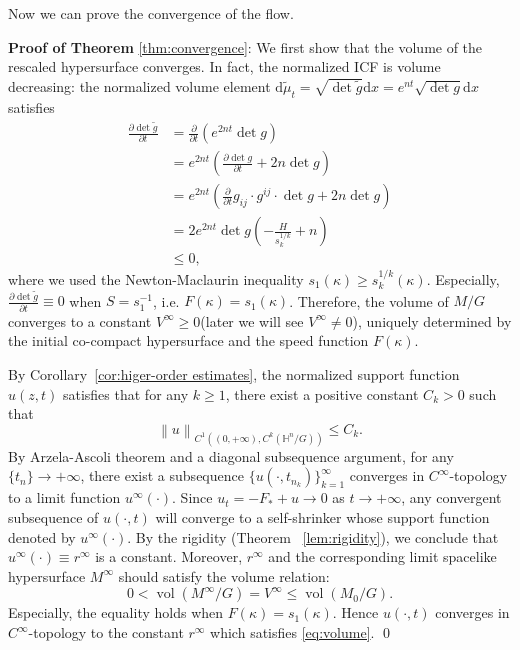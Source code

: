 \documentclass[reqno]{amsart}
\theoremstyle{remark}
\newcommand{\norm}[1]{\left\lVert{#1}\right\rVert}
\newcommand{\dd}{\ensuremath{\text{d}}}
\renewcommand{\H}{{\mathbb{H}}}
\newcommand{\pd}[2]{\frac{\partial {#1}}{\partial {#2}}}
\theoremstyle{definition}
\numberwithin{equation}{section}
\begin{document}
Now we can prove the convergence of the flow. \par
\textbf{Proof of Theorem }{\ref{thm:convergence}}: 
We first show that the volume of the rescaled hypersurface converges. In fact, the normalized ICF is volume decreasing: the normalized volume element \(\dd \tilde{\mu}_t = \sqrt{\det \tilde{g}}\dd x = e^{nt} \sqrt{\det g}\dd x\) satisfies 
\[ \begin{aligned}
    \pd{\det \tilde{g}}{t} &= \pd{}{t}\left(e^{2nt} \det g \right) \\
    &= e^{2nt}\left( \pd{\det g}{t} + 2n\det g \right) \\
    &= e^{2nt}\left( \pd{}{t}g_{ij} \cdot g^{ij} \cdot \det g + 2n\det g \right) \\
    &= 2e^{2nt}\det g \left( -\frac{H}{s_k^{1/k}} + n \right) \\
    &\leq 0,
\end{aligned}  \]
where we used the Newton-Maclaurin inequality \( s_1(\kappa)\geq s_k^{1/k}(\kappa) \). Especially, \(\pd{\det \tilde{g}}{t} \equiv 0\) when \(S = s_1^{-1}\), i.e. \(F(\kappa) = s_1(\kappa)\). Therefore, the volume of \(M / G\) converges to a constant \(V^\infty \geq 0\)(later we will see \(V^\infty \neq 0\)), uniquely determined by the initial co-compact hypersurface and the speed function \(F(\kappa)\).  
\par By Corollary~\ref{cor:higer-order estimates}, the normalized support function \(u(z,t)\) satisfies that for any \(k \geq 1\), there exist a positive constant \(C_k>0\) such that 
\[ \norm{u}_{C^1\left( (0,+\infty),C^k(\H^n / G) \right)} \leq C_k.\]
By Arzela-Ascoli theorem and a diagonal subsequence argument, for any \(\{t_n\}\to +\infty\), there exist a subsequence \(\{u(\cdot,t_{n_k})\}_{k=1}^{\infty}\) converges in \(C^{\infty}\)-topology to a limit function \(u^{\infty}(\cdot)\). Since \(u_t = -F_* + u \to 0\) as \(t\to +\infty\), any convergent subsequence of \(u(\cdot,t)\) will converge to a self-shrinker whose support function denoted by \(u^{\infty}(\cdot)\). By the rigidity (Theorem ~\ref{lem:rigidity}), we conclude that \(u^{\infty}(\cdot) \equiv r^\infty\) is a constant. Moreover, \(r^{\infty}\) and the corresponding limit spacelike hypersurface \(M^{\infty}\) should satisfy the volume relation: 
\begin{equation}\label{eq:volume}
0 < \operatorname{vol} (M^{\infty}/G) = V^{\infty} \leq \operatorname{vol} (M_0/G).
\end{equation}
Especially, the equality holds when \(F(\kappa) = s_1(\kappa)\). Hence \(u(\cdot,t)\) converges in \(C^{\infty}\)-topology to the constant \(r^{\infty}\) which satisfies \eqref{eq:volume}. \qed 
\end{document}
